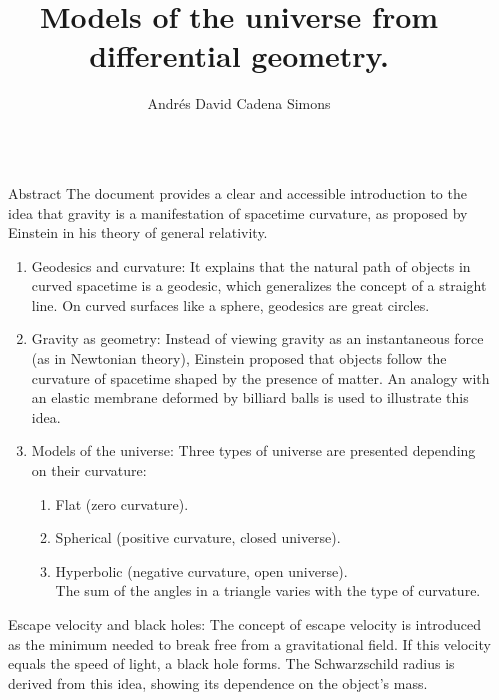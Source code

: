 \documentclass[final]{beamer}
\title{Models of the universe from differential geometry.}
\author{Andrés David Cadena Simons}
\institute[shortinst]{Departamento de Matemáticas, Universidad Nacional de Colombia sede Bogotá.}
\newlength{\sepwidth}
\newlength{\colwidth}
\newcommand{\separatorcolumn}{\begin{column}{\sepwidth}\end{column}}
\begin{document}

\begin{frame}[t]
\begin{columns}[t]
\separatorcolumn

\begin{column}{\colwidth}

  \begin{block}{Abstract}
    The document provides a clear and accessible introduction to the idea that gravity is a manifestation of spacetime curvature, as proposed by Einstein in his theory of general relativity.
    \begin{enumerate}
      \item Geodesics and curvature: It explains that the natural path of objects in curved spacetime is a geodesic, which generalizes the concept of a straight line. On curved surfaces like a sphere, geodesics are great circles.
      \item Gravity as geometry: Instead of viewing gravity as an instantaneous force (as in Newtonian theory), Einstein proposed that objects follow the curvature of spacetime shaped by the presence of matter. An analogy with an elastic membrane deformed by billiard balls is used to illustrate this idea.
      \item Models of the universe: Three types of universe are presented depending on their curvature:
      \begin{enumerate}
        \item Flat (zero curvature).
        \item Spherical (positive curvature, closed universe).
        \item Hyperbolic (negative curvature, open universe).\\
          The sum of the angles in a triangle varies with the type of curvature.
      \end{enumerate}
    \end{enumerate}
    \item Escape velocity and black holes: The concept of escape velocity is introduced as the minimum needed to break free from a gravitational field. If this velocity equals the speed of light, a black hole forms. The Schwarzschild radius is derived from this idea, showing its dependence on the object's mass.
  \end{block}


\end{column}
\end{columns}
\end{frame}
\end{document}
